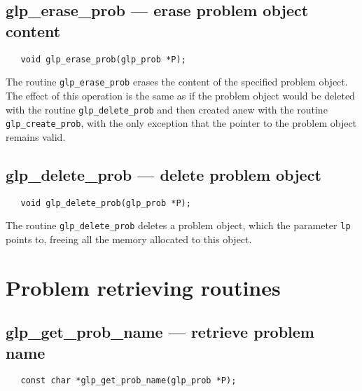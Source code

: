 \subsection{glp\_erase\_prob --- erase problem object content}

\synopsis

\begin{verbatim}
   void glp_erase_prob(glp_prob *P);
\end{verbatim}

\description

The routine \verb|glp_erase_prob| erases the content of the specified
problem object. The effect of this operation is the same as if the
problem object would be deleted with the routine \verb|glp_delete_prob|
and then created anew with the routine \verb|glp_create_prob|, with the
only exception that the pointer to the problem object remains valid.


\subsection{glp\_delete\_prob --- delete problem object}

\synopsis

\begin{verbatim}
   void glp_delete_prob(glp_prob *P);
\end{verbatim}

\description

The routine \verb|glp_delete_prob| deletes a problem object, which the
parameter \verb|lp| points to, freeing all the memory allocated to this
object.


\newpage

\section{Problem retrieving routines}

\subsection{glp\_get\_prob\_name --- retrieve problem name}

\synopsis

\begin{verbatim}
   const char *glp_get_prob_name(glp_prob *P);
\end{verbatim}

